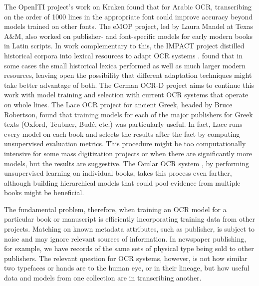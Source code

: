 \documentclass[twoside,11pt]{report}
\begin{document}
The OpenITI project's work on Kraken \citep{kiessling17:_impor_new_devel_arabog_optic} found that for Arabic OCR, transcribing on the order of 1000 lines in the appropriate font could improve accuracy beyond models trained on other fonts.  The eMOP project, led by Laura Mandel at Texas A\&M, also worked on publisher- and font-specific models for early modern books in Latin scripts.  In work complementary to this, the IMPACT project distilled historical corpora into lexical resources to adapt OCR systems \citep[\S{}4.3.2]{piotrowski12:nlpht}.  \cite{gotscharek09:_lexic_resour_digit_histor_docum} found that in some cases the small historical lexica performed as well as much larger modern resources, leaving open the possibility that different adaptation techniques might take better advantage of both.  The German OCR-D project aims to continue this work with model training and selection with current OCR systems that operate on whole lines.  The Lace OCR project for ancient Greek, headed by Bruce Robertson, found that training models for each of the major publishers for Greek texts (Oxford, Teubner, Budé, etc.) was particularly useful. In fact, Lace runs every model on each book and selects the results after the fact by computing unsupervised evaluation metrics. This procedure might be too computationally intensive for some mass digitization projects or when there are significantly more models, but the results are suggestive.  The Ocular OCR system \citep{berg-kirkpatrick13:_unsup_trans_histor_docum,garrette15:_unsup_code_switc_multil_histor_docum_trans}, by performing unsupervised learning on individual books, takes this process even farther, although building hierarchical models that could pool evidence from multiple books might be beneficial.

The fundamental problem, therefore, when training an OCR model for a particular book or manuscript is efficiently incorporating training data from other projects. Matching on known metadata attributes, such as publisher, is subject to noise and may ignore relevant sources of information. In newspaper publishing, for example, we have records of the same sets of physical type being sold to other publishers. The relevant question for OCR systems, however, is not how similar two typefaces or hands are to the human eye, or in their lineage, but how useful data and models from one collection are in transcribing another.
\end{document}
